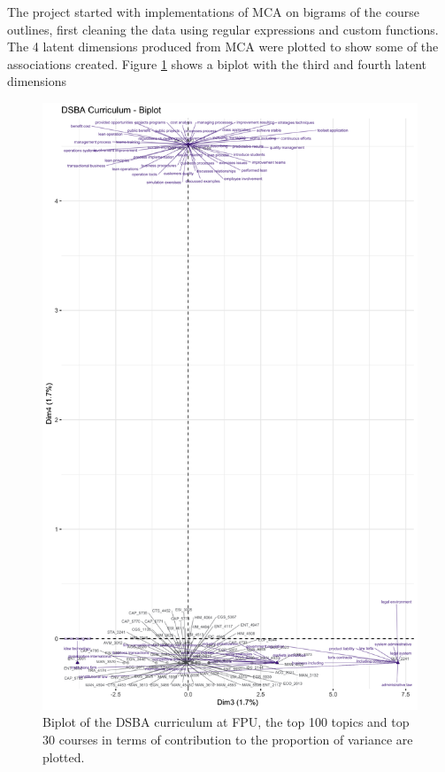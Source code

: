The project started with implementations of MCA on bigrams of the course outlines,  first cleaning the data using regular expressions 
\cite{regex} and custom functions.  The 4 latent dimensions produced from MCA were plotted to show some of the associations created.  Figure \ref{fig:mca_2} 
shows a biplot with the third and fourth latent dimensions


\begin{figure}[H]
\centering

\includegraphics[width = 1\textwidth, height = .9\textheight]{Content/images/mca_bp_2.png}
\caption{Biplot of the DSBA curriculum at FPU,  the top 100 topics and top 30 courses in terms of contribution to the proportion of variance are plotted.}
\label{fig:mca_2}
\end{figure}

